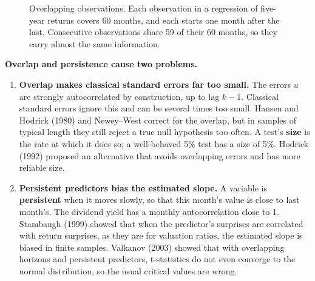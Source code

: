 \begin{figure}[!htbp]
  \centering
\caption{Overlapping observations. Each observation in a regression of five-year returns covers 60 months, and each starts one month after the last. Consecutive observations share 59 of their 60 months, so they carry almost the same information.}
\label{fig:03-overlap}
\end{figure}



\textbf{Overlap and persistence cause two problems.}

\begin{enumerate}
  \item \textbf{Overlap makes classical standard errors far too small.} The errors $u$ are strongly autocorrelated by construction, up to lag $k - 1$. Classical standard errors ignore this and can be several times too small. Hansen and Hodrick (1980) and Newey--West correct for the overlap, but in samples of typical length they still reject a true null hypothesis too often. A test's \textbf{size} is the rate at which it does so; a well-behaved 5\% test has a size of 5\%. Hodrick (1992) proposed an alternative that avoids overlapping errors and has more reliable size.
  \item \textbf{Persistent predictors bias the estimated slope.} A variable is \textbf{persistent} when it moves slowly, so that this month's value is close to last month's. The dividend yield has a monthly autocorrelation close to 1. Stambaugh (1999) showed that when the predictor's surprises are correlated with return surprises, as they are for valuation ratios, the estimated slope is biased in finite samples. Valkanov (2003) showed that with overlapping horizons and persistent predictors, t-statistics do not even converge to the normal distribution, so the usual critical values are wrong.
\end{enumerate}

